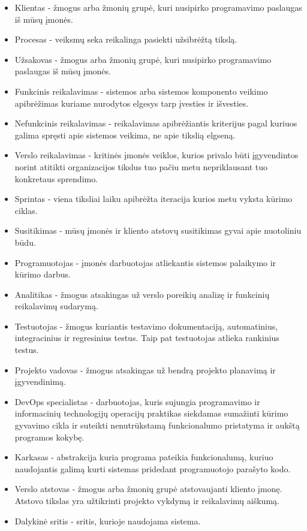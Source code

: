 \documentclass{VUMIFPSkursinis}
\begin{document}
	\begin{itemize}
		\item{Klientas - žmogus arba žmonių grupė, kuri nusipirko programavimo paslaugas iš mūsų įmonės.}
		\item{Procesas - veiksmų seka reikalinga pasiekti užsibrėžtą tikslą.}
		\item{Užsakovas - žmogus arba žmonių grupė, kuri nusipirko programavimo paslaugas iš mūsų įmonės.}
		\item{Funkcinis reikalavimas - sistemos arba sistemos komponento veikimo apibrėžimas kuriame nurodytos elgesys tarp įvesties ir išvesties.}
		\item{Nefunkcinis reikalavimas - reikalavimas apibrėžiantis kriterijus pagal kuriuos galima spręsti apie sistemos veikima, ne apie tikslią elgseną.}
		\item{Verslo reikalavimas - kritinės įmonės veiklos, kurios privalo būti įgyvendintos norint atitikti organizacijos tikslus tuo pačiu metu nepriklausant tuo konkretaus sprendimo.}
		\item{Sprintas - viena tiksliai laiku apibrėžta iteracija kurios metu vyksta kūrimo ciklas.}
		\item{Susitikimas - mūsų įmonės ir kliento atstovų susitikimas gyvai apie nuotoliniu būdu.}
		\item{Programuotojas - įmonės darbuotojas atliekantis sistemos palaikymo ir kūrimo darbus.}
		\item{Analitikas - žmogus atsakingas už verslo poreikių analizę ir funkcinių reikalavimų sudarymą.}
		\item{Testuotojas - žmogus kuriantis testavimo dokumentaciją, automatinius, integracinius ir regresinius testus. Taip pat testuotojas atlieka rankinius testus.}
		\item{Projekto vadovas - žmogus atsakingas už bendrą projekto planavimą ir įgyvendinimą.}
		\item{DevOps specialistas - darbuotojas, kuris sujungia programavimo ir informacinių technologijų operacijų praktikas siekdamas sumažinti kūrimo gyvavimo cikla ir suteikti nenutrūkstamą funkcionalumo pristatyma ir aukštą programos kokybę.}
		\item{Karkasas - abstrakcija kuria programa pateikia funkcionalumą, kuriuo naudojantis galimą kurti sistemas pridedant programuotojo parašyto kodo.}
		\item{Verslo atstovas - žmogus arba žmonių grupė atstovaujanti kliento įmonę. Atstovo tikslas yra užtikrinti projekto vykdymą ir reikalavimų aiškumą.}
		\item{Dalykinė sritis - sritis, kurioje naudojama sistema.}
	\end{itemize}
\end{document}
